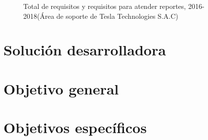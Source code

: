 \begin{spacing}{1.5}
	\begin{figure}[H]
		\begin{center}
			\tikzI
		\end{center}
		\caption {\centering \small{Total de requisitos y requisitos para atender reportes,  2016-2018(\'{A}rea de soporte de Tesla Technologies S.A.C)}} \label{figure:chaperI_1}
	\end{figure}
	
\end{spacing}

\section{Soluci\'{o}n desarrolladora}
\begin{spacing}{1.5}
\end{spacing}
\section{Objetivo general}
\begin{spacing}{1.5}
\end{spacing}
\section{Objetivos espec\'{i}ficos}
\begin{spacing}{1.5}
\end{spacing}


	

